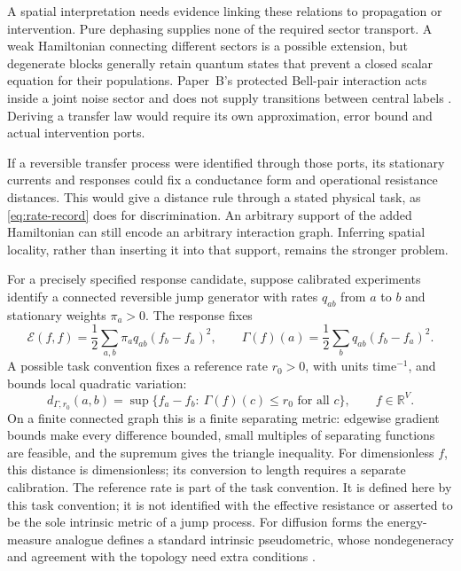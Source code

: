 \documentclass[12pt,a4paper]{article}
\begin{document}
A spatial interpretation needs evidence linking these relations to
propagation or intervention. Pure dephasing supplies none of the
required sector transport. A weak Hamiltonian connecting different
sectors is a possible extension, but degenerate blocks generally
retain quantum states that prevent a closed scalar equation for their
populations. Paper~B's protected Bell-pair interaction acts inside a
joint noise sector and does not supply transitions between central
labels \cite{Liu2026PaperB}. Deriving a transfer law would require
its own approximation, error bound and actual intervention ports.

If a reversible transfer process were identified through those
ports, its stationary currents and responses could fix a conductance
form and operational resistance distances. This would give a
distance rule through a stated physical task, as
\eqref{eq:rate-record} does for discrimination. An arbitrary support
of the added Hamiltonian can still encode an arbitrary interaction
graph. Inferring spatial locality, rather than inserting it into
that support, remains the stronger problem.

For a precisely specified response candidate, suppose calibrated
experiments identify a connected reversible jump generator with
rates $q_{ab}$ from $a$ to $b$ and stationary weights $\pi_a>0$.
The response fixes
\[
 \mathcal E(f,f)=\frac12\sum_{a,b}\pi_aq_{ab}(f_b-f_a)^2,\qquad
 \Gamma(f)(a)=\frac12\sum_bq_{ab}(f_b-f_a)^2 .
\]
A possible task convention fixes a reference rate $r_0>0$, with
units $\mathrm{time}^{-1}$, and bounds local quadratic variation:
\begin{equation}
 d_{\Gamma,r_0}(a,b)=\sup\{f_a-f_b:\ \Gamma(f)(c)\le r_0
                           \text{ for all }c\},\qquad f\in\mathbb R^V.
 \label{eq:response-distance}
\end{equation}
On a finite connected graph this is a finite separating metric:
edgewise gradient bounds make every difference bounded, small
multiples of separating functions are feasible, and the supremum
gives the triangle inequality. For dimensionless $f$, this distance
is dimensionless; its conversion to length requires a separate
calibration. The reference rate is part of the task convention.
It is defined here by this task convention; it is not identified
with the effective resistance or asserted to be the sole intrinsic
metric of a jump process. For diffusion forms the energy-measure
analogue defines a standard intrinsic pseudometric, whose
nondegeneracy and agreement with the topology need extra conditions
\cite{Sturm1995}.
\end{document}
